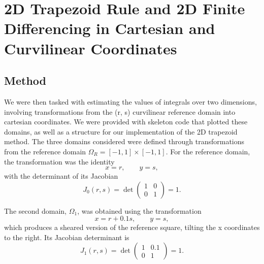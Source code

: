 \documentclass[12pt]{article}
\begin{document}
\section{2D Trapezoid Rule and 2D Finite Differencing in Cartesian and Curvilinear Coordinates}

\subsection{Method}
We were then tasked with estimating the values of integrals over two dimensions, involving transformations from the (r, s) curvilinear reference domain into cartesian coordinates. We were provided with skeleton code that plotted these domains, as well as a structure for our implementation of the 2D trapezoid method. 
The three domains considered were defined through transformations from the reference domain $\Omega_R=[-1,1]\times[-1,1]$. For the reference domain, the transformation was the identity
\begin{equation}
    x=r,\qquad y=s,
\end{equation}
with the determinant of its Jacobian
\begin{equation}
    J_0(r,s)
    =
    \det
    \begin{pmatrix}
        1 & 0\\
        0 & 1
    \end{pmatrix}
    =1.
\end{equation}
 
\noindent The second domain, $\Omega_1$, was obtained using the transformation
\begin{equation}
    x=r+0.1s,\qquad y=s,
\end{equation}
which produces a sheared version of the reference square, tilting the x coordinates to the right. Its Jacobian determinant is
\begin{equation}
    J_1(r,s)
    =
    \det
    \begin{pmatrix}
        1 & 0.1\\
        0 & 1
    \end{pmatrix}
    =1.
\end{equation}
\end{document}
